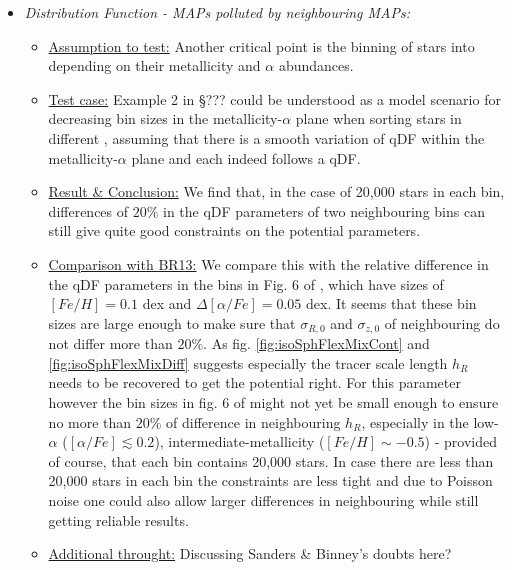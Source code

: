 \begin{itemize}
\begin{itemize}
\item \emph{Distribution Function - MAPs polluted by neighbouring MAPs:} 
\begin{itemize} 
\item \underline{Assumption to test:} Another critical point is the binning of stars into \MAPs depending on their metallicity and $\alpha$ abundances. 
\item \underline{Test case:} Example 2 in \S ??? could be understood as a model scenario for decreasing bin sizes in the metallicity-$\alpha$ plane when sorting stars in different \MAPs, assuming that there is a smooth variation of qDF within the metallicity-$\alpha$ plane and each \MAP indeed follows a qDF. 
\item \underline{Result \& Conclusion:} We find that, in the case of 20,000 stars in each bin, differences of $20\%$ in the qDF parameters of two neighbouring bins can still give quite good constraints on the potential parameters. 
\item \underline{Comparison with BR13:} We compare this with the relative difference in the qDF parameters in the bins in Fig. 6 of \cite{bov13}, which have sizes of $[Fe/H] = 0.1$ dex and $\Delta [\alpha/Fe] = 0.05$ dex. It seems that these bin sizes are large enough to make sure that $\sigma_{R,0}$ and $\sigma_{z,0}$ of neighbouring \MAPs do not differ more than $20\%$. As fig. \ref{fig:isoSphFlexMixCont} and \ref{fig:isoSphFlexMixDiff} suggests especially the tracer scale length $h_R$ needs to be recovered to get the potential right. For this parameter however the bin sizes in fig. 6 of \cite{bov13} might not yet be small enough to ensure no more than $20\%$ of difference in neighbouring $h_R$, especially in the low-$\alpha$ ($[\alpha/Fe] \lesssim 0.2$), intermediate-metallicity ($[Fe/H] \sim -0.5$) \MAPs - provided of course, that each bin contains 20,000 stars. In case there are less than 20,000 stars in each bin the constraints are less tight and due to Poisson noise one could also allow larger differences in neighbouring \MAPs while still getting reliable results.
\item \underline{Additional throught:} Discussing Sanders \& Binney's doubts here?
\end{itemize}


\end{itemize}
\end{itemize}
